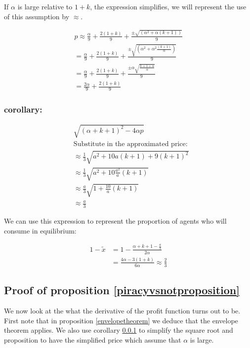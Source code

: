 If $\alpha$ is large relative to $1+k$, the expression simplifies, we will represent the use of this assumption by $\approx$. 

\begin{align*}
p \approx \frac{\alpha}{9}+\frac{2(1+k)}{9}+\frac{ \pm \sqrt{(\alpha^2+\alpha (k+1))}}{9 } \\
=\frac{\alpha}{9}+\frac{2(1+k)}{9}+\frac{ \pm \sqrt{(\alpha^2+\alpha^2 \frac{(k+1)}{\alpha})}}{9 } \\
=\frac{\alpha}{9}+\frac{2(1+k)}{9}+\frac{ \pm \alpha \sqrt{ \frac{k+1+\alpha}{\alpha}}}{9} \\
=\frac{2\alpha}{9}+\frac{2(1+k)}{9}
\end{align*}


\subsubsection{corollary:}
\label{squareroot}

\begin{align*}
&\sqrt{(\alpha+k+1)^2-4 \alpha p} \\
&\text{Substitute in the approximated price:} \\
&\approx\frac{1}{3} \sqrt{a^2+10 a (k+1)+9 (k+1)^2} \\
&\approx \frac{1}{3} \sqrt{a^2+10  \frac{a^2}{a} (k+1)} \\
&\approx \frac{a}{3} \sqrt{1+ \frac{10}{a} (k+1)} \\
&\approx  \frac{a}{3}
\end{align*}

We can use this expression to represent the proportion of agents who will consume in equilibrium:

\begin{align}
1-\tilde{x} &= 1-\frac{\alpha+k+1-\frac{a}{3}}{2 \alpha} \\
&=\frac{4\alpha-3(1+k)}{6\alpha}
\approx \frac{2}{3}
\end{align}


\subsection{Proof of proposition \ref{piracyvsnotproposition}} \label{piracyvsnot}

We now look at the what the derivative of the profit function turns out to be. First note that in proposition \ref{envelopetheorem} we deduce that the envelope theorem applies. We also use corollary \ref{squareroot} to simplify the square root and proposition to have the simplified price which assume that $\alpha$ is large. 

